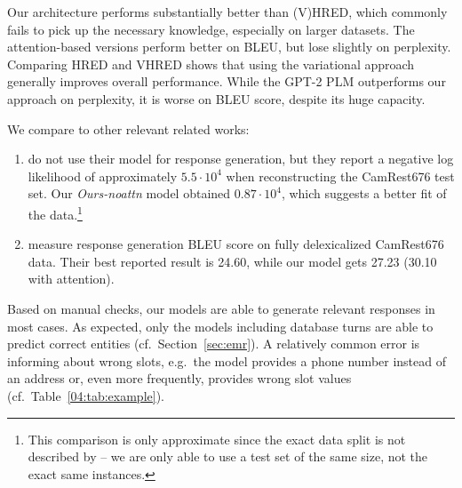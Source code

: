 Our architecture performs substantially better than (V)HRED, which commonly fails to pick up the necessary knowledge, especially on larger datasets.
The attention-based versions perform better on BLEU, but lose slightly on perplexity.
Comparing HRED and VHRED shows that using the variational approach generally improves overall performance.
While the GPT-2 PLM outperforms our approach on perplexity, it is worse on BLEU score, despite its huge capacity.

We compare to other relevant related works:
\begin{enumerate}
\item \citet{shi2019unsupervised} do not use their model for response generation, but they report a negative log likelihood of approximately $5.5 \cdot 10^{4}$ when reconstructing the CamRest676 test set. Our \emph{Ours-noattn} model obtained $0.87 \cdot 10^{4}$, which suggests a better fit of the data.\footnote{This comparison is only approximate since the exact data split is not described by \citet{shi2019unsupervised} -- we are only able to use a test set of the same size, not the exact same instances.}
\item \citet{wen2017latent} measure response generation BLEU score on fully delexicalized CamRest676 data. Their best reported result is 24.60, while our model gets 27.23 (30.10 with attention).
\end{enumerate}

Based on manual checks,
our models are able to generate relevant responses in most cases.
As expected, only the models including database turns are able to predict correct entities (cf.~Section~\ref{sec:emr}).
A relatively common error is informing about wrong slots, e.g.\ the model provides a phone number instead of an address or, even more frequently, provides wrong slot values (cf.~Table~\ref{04:tab:example}).

